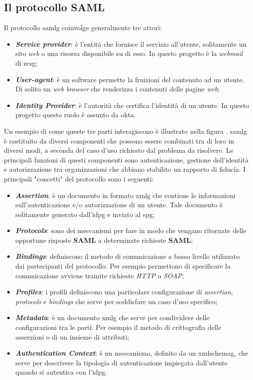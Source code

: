 \subsection{Il protocollo SAML}
Il protocollo \gls{samlg} coinvolge generalmente tre attori:
\begin{itemize}
    \item \textit{\textbf{Service provider}}: è l'entità che fornisce il servizio all'utente, solitamente un sito \textit{web} o una risorsa disponibile su di esso. In questo progetto è la \textit{webmail} di \gls{zcsg};
    \item \textit{\textbf{User-agent}}: è un software permette la fruizioni del contenuto ad un utente. Di solito un \textit{web browser} che renderizza i contenuti delle pagine \textit{web};
    \item \textit{\textbf{Identity Provider}}: è l'autorità che certifica l'identità di un utente. In questo progetto questo ruolo è assunto da \gls{okta}.
\end{itemize}
Un esempio di come queste tre parti interagiscono è illustrato nella figura .
\gls{samlg} è costituito da diversi componenti che possono essere combinati tra di loro in diversi modi, a seconda del caso d'uso richiesto dal problema da risolvere. Le principali funzioni di questi componenti sono autenticazione, gestione dell'identità e autorizzazione tra organizzazioni che abbiano stabilito un rapporto di fiducia. I principali "concetti" del protocollo sono i seguenti:
\begin{itemize}
    \item \textit{\textbf{Assertion}}: è un documento in formato \gls{xmlg} che contiene le informazioni sull'autenticazione e/o autorizzazione di un utente. Tale documento è solitamente generato dall'\gls{idpg} e inviato al \gls{spg};
    \item \textit{\textbf{Protocols}}: sono dei meccanismi per fare in modo che vengano ritornate delle opportune risposte \textbf{SAML} a determinate richieste \textbf{SAML};
    \item \textit{\textbf{Bindings}}: definiscono il metodo di comunicazione a basso livello utilizzato dai partecipanti del protocollo. Per esempio permettono di specificare la comunicazione avviene tramite richieste \textit{HTTP} o \textit{SOAP};
    \item \textit{\textbf{Profiles}}: i profili definiscono una particolare configurazione di \textit{assertion}, \textit{protocols} e \textit{bindings} che serve per soddisfare un caso d'uso specifico;
    \item \textit{\textbf{Metadata}}: è un documento \gls{xmlg} che serve per condividere delle configurazioni tra le parti. Per esempio il metodo di crittografia delle asserzioni o di un insieme di attributi;
    \item \textit{\textbf{Authentication Context}}: è un meccanismo, definito da un \gls{xmlschemag}, che serve per descrivere la tipologia di autenticazione impiegata dall'utente quando si autentica con l'\gls{idpg}.
\end{itemize}

